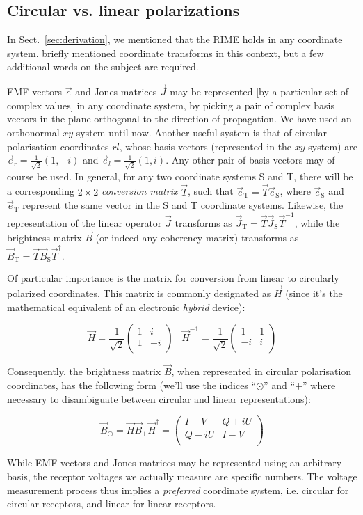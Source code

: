 \documentclass[]{aa}
\newcommand{\matrixtt}[4]{\left( \begin{array}{cc}#1&#2\\#3&#4\\\end{array} \right)}
\begin{document}
\subsection{\label{sec:circular}Circular vs. linear polarizations}

In Sect.~\ref{sec:derivation}, we mentioned that the RIME holds in any coordinate system. \citet{ME1} briefly mentioned coordinate transforms in this context, but a few additional words on the subject are required.

EMF vectors $\vec e$ and Jones matrices $\vec J$ may be represented [by a particular set of complex values] in any coordinate system, by picking a pair of complex basis vectors in the plane orthogonal to the direction of propagation. We have used an orthonormal $xy$ system until now. Another useful system is that of circular polarisation coordinates $rl$, whose basis vectors (represented in the $xy$ system) are $\vec e_r=\frac{1}{\sqrt{2}}(1,-i)$ and $\vec e_l=\frac{1}{\sqrt{2}}(1,i)$. Any other pair of basis vectors may of course be used. In general, for any two coordinate systems S and T, there will be a corresponding $2\times2$ {\em conversion matrix} $\vec T$, such that $\vec e_\mathrm{T}=\vec T \vec e_\mathrm{S}$, where $\vec e_\mathrm{S}$ and $\vec e_\mathrm{T}$ represent the same vector in the S and T coordinate systems. Likewise, the representation of the linear operator $\vec J$ transforms as $\vec J_\mathrm{T}=\vec T \vec J_\mathrm{S} \vec T^{-1}$, while the brightness matrix $\vec B$ (or indeed any coherency matrix) transforms as $\vec B_\mathrm{T}=\vec T \vec B_\mathrm{S} \vec T^\dagger.$

Of particular importance is the matrix for conversion from linear to circularly polarized coordinates. This matrix is commonly designated as $\vec H$ (since it's the mathematical equivalent of an electronic {\em hybrid} device):

\[
\vec H = \frac{1}{\sqrt{2}} \matrixtt{1}{i}{1}{-i} \;\;\; \vec H^{-1} = \frac{1}{\sqrt{2}} \matrixtt{1}{1}{-i}{i}
\]

Consequently, the brightness matrix $\vec B$, when represented in circular polarisation coordinates, has the following form (we'll use the indices ``$\odot$'' and ``$+$'' where necessary to disambiguate between circular and linear representations):

\[
\vec B_{\odot} = \vec H \vec B_{+} \vec H^\dagger = \matrixtt{I+V}{Q+iU}{Q-iU}{I-V}
\]

While EMF vectors and Jones matrices may be represented using an arbitrary basis, the receptor voltages we actually measure are specific numbers. The voltage measurement process thus implies a {\em preferred} coordinate system, i.e. circular for circular receptors, and linear for linear receptors. 
\end{document}
